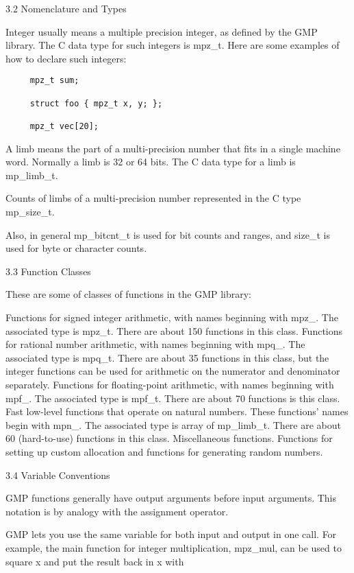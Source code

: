 3.2 Nomenclature and Types

Integer usually means a multiple precision integer, as defined
by the GMP library. The C data type for such integers is mpz\_t. Here are some
examples of how to declare such integers:
\begin{lstlisting}
     mpz_t sum;
     
     struct foo { mpz_t x, y; };
     
     mpz_t vec[20];
\end{lstlisting}         

A limb means the part of a multi-precision number that fits in a single machine
word. Normally a limb is 32 or 64 bits. The C data type for a limb is
mp\_limb\_t.

Counts of limbs of a multi-precision number represented in the C type mp\_size\_t.

Also, in general mp\_bitcnt\_t is used for bit counts and ranges, and size\_t is
used for byte or character counts.

3.3 Function Classes

These are some of classes of functions in the GMP library:

Functions for signed integer arithmetic, with names beginning with mpz\_. The
associated type is mpz\_t. There are about 150 functions in this class.
Functions for rational number arithmetic, with names beginning with mpq\_. The
associated type is mpq\_t. There are about 35 functions in this class, but the
integer functions can be used for arithmetic on the numerator and denominator
separately.
Functions for floating-point arithmetic, with names beginning with mpf\_. The
associated type is mpf\_t. There are about 70 functions is this class.
Fast low-level functions that operate on natural numbers. These functions' names
begin with mpn\_. The associated type is array of mp\_limb\_t. There are about
60 (hard-to-use) functions in this class.
Miscellaneous functions. Functions for setting up custom allocation and
functions for generating random numbers.

3.4 Variable Conventions

GMP functions generally have output arguments before input arguments. This
notation is by analogy with the assignment operator.

GMP lets you use the same variable for both input and output in one call. For
example, the main function for integer multiplication, mpz\_mul, can be used to
square x and put the result back in x with

